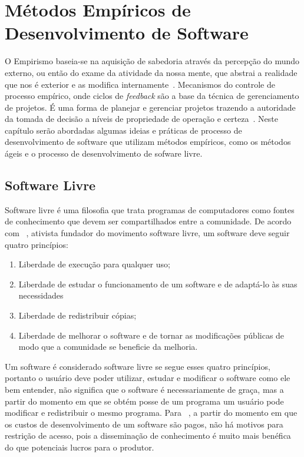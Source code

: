\chapter{Métodos Empíricos de Desenvolvimento de Software}
\label{cap:desenvolvimento-empirico}

O Empirismo baseia-se na aquisição de sabedoria através da percepção do mundo 
externo, ou então do exame da atividade da nossa mente, que abstrai a realidade 
que nos é exterior e as modifica internamente~\cite{chaui2003}.
%
Mecanismos do controle de processo empírico, onde ciclos de \emph{feedback} são a base da técnica de gerenciamento de projetos.
%
É uma forma de planejar e gerenciar projetos trazendo a autoridade da tomada de decisão a níveis de propriedade de operação e certeza~\cite{Schwaber2004}.
%
Neste capítulo serão abordadas algumas ideias e práticas de processo de desenvolvimento
de software que utilizam métodos empíricos, como os métodos ágeis e o processo
de desenvolvimento de sofware livre.
%
\section{Software Livre}

Software livre é uma filosofia que trata programas de computadores como fontes de 
conhecimento que devem ser compartilhados entre a comunidade.
%
De acordo com ~, ativista fundador do movimento software livre, um software deve seguir quatro princípios:
%
\begin{enumerate}
\item Liberdade de execução para qualquer uso;
\item Liberdade de estudar o funcionamento de um software e de adaptá-lo às suas 
necessidades
\item Liberdade de redistribuir cópias;
\item Liberdade de melhorar o software e de tornar as modificações públicas de modo 
que a comunidade se beneficie da melhoria.
\end{enumerate}
%
Um software é considerado software livre se segue esses quatro princípios, portanto 
o usuário deve poder utilizar, estudar e modificar o software como ele bem entender, 
não significa que o software é necessariamente de graça, mas a partir do momento em 
que se obtém posse de um programa um usuário pode modificar e redistribuir o mesmo 
programa.
%
Para ~, a partir do momento em que os custos de desenvolvimento de um software são pagos, não há motivos para restrição de acesso, pois a disseminação de conhecimento é muito mais benéfica do que potenciais lucros para o produtor.

